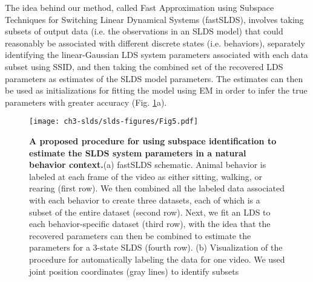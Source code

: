 The idea behind our method, called Fast Approximation using Subspace Techniques for Switching Linear Dynamical Systems (fastSLDS), involves taking subsets of output data (i.e. the observations in an SLDS model) that could reasonably be associated with different discrete states (i.e. behaviors), separately identifying the linear-Gaussian LDS system parameters associated with each data subset using SSID, and then taking the combined set of the recovered LDS parameters as estimates of the SLDS model parameters. The estimates can then be used as initializations for fitting the model using EM in order to infer the true parameters with greater accuracy (Fig. \ref{fig:slds:5}a).    
\begin{figure}[t!]
  \begin{center}
    \texttt{[image: ch3-slds/slds-figures/Fig5.pdf]}
    \caption[A proposed procedure for using subspace identification to estimate the SLDS system parameters in a natural behavior context]{\textbf{A proposed procedure for using subspace identification to estimate the SLDS system parameters in a natural behavior context.}(a) fastSLDS schematic. Animal behavior is labeled at each frame of the video as either sitting, walking, or rearing (first row). We then combined all the labeled data associated with each behavior to create three datasets, each of which is a subset of the entire dataset (second row). Next, we fit an LDS to each behavior-specific dataset (third row), with the idea that the recovered parameters can then be combined to estimate the parameters for a 3-state SLDS (fourth row). (b) Visualization of the procedure for automatically labeling the data for one video. We used joint position coordinates (gray lines) to identify subsets}
    \label{fig:slds:5}
  \end{center}
  \vspace{-1.0cm}
\end{figure}

\begin{figure}[t!]
\end{figure}



